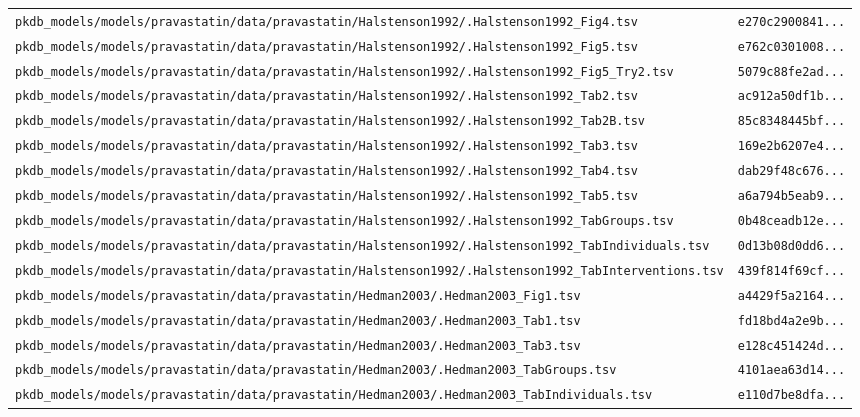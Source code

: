 \documentclass{article}
\begin{document}
\begin{longtable}{ll}
\texttt{pkdb\_models/models/pravastatin/data/pravastatin/Halstenson1992/.Halstenson1992\_Fig4.tsv} & \texttt{e270c2900841...} \\
\texttt{pkdb\_models/models/pravastatin/data/pravastatin/Halstenson1992/.Halstenson1992\_Fig5.tsv} & \texttt{e762c0301008...} \\
\texttt{pkdb\_models/models/pravastatin/data/pravastatin/Halstenson1992/.Halstenson1992\_Fig5\_Try2.tsv} & \texttt{5079c88fe2ad...} \\
\texttt{pkdb\_models/models/pravastatin/data/pravastatin/Halstenson1992/.Halstenson1992\_Tab2.tsv} & \texttt{ac912a50df1b...} \\
\texttt{pkdb\_models/models/pravastatin/data/pravastatin/Halstenson1992/.Halstenson1992\_Tab2B.tsv} & \texttt{85c8348445bf...} \\
\texttt{pkdb\_models/models/pravastatin/data/pravastatin/Halstenson1992/.Halstenson1992\_Tab3.tsv} & \texttt{169e2b6207e4...} \\
\texttt{pkdb\_models/models/pravastatin/data/pravastatin/Halstenson1992/.Halstenson1992\_Tab4.tsv} & \texttt{dab29f48c676...} \\
\texttt{pkdb\_models/models/pravastatin/data/pravastatin/Halstenson1992/.Halstenson1992\_Tab5.tsv} & \texttt{a6a794b5eab9...} \\
\texttt{pkdb\_models/models/pravastatin/data/pravastatin/Halstenson1992/.Halstenson1992\_TabGroups.tsv} & \texttt{0b48ceadb12e...} \\
\texttt{pkdb\_models/models/pravastatin/data/pravastatin/Halstenson1992/.Halstenson1992\_TabIndividuals.tsv} & \texttt{0d13b08d0dd6...} \\
\texttt{pkdb\_models/models/pravastatin/data/pravastatin/Halstenson1992/.Halstenson1992\_TabInterventions.tsv} & \texttt{439f814f69cf...} \\
\texttt{pkdb\_models/models/pravastatin/data/pravastatin/Hedman2003/.Hedman2003\_Fig1.tsv} & \texttt{a4429f5a2164...} \\
\texttt{pkdb\_models/models/pravastatin/data/pravastatin/Hedman2003/.Hedman2003\_Tab1.tsv} & \texttt{fd18bd4a2e9b...} \\
\texttt{pkdb\_models/models/pravastatin/data/pravastatin/Hedman2003/.Hedman2003\_Tab3.tsv} & \texttt{e128c451424d...} \\
\texttt{pkdb\_models/models/pravastatin/data/pravastatin/Hedman2003/.Hedman2003\_TabGroups.tsv} & \texttt{4101aea63d14...} \\
\texttt{pkdb\_models/models/pravastatin/data/pravastatin/Hedman2003/.Hedman2003\_TabIndividuals.tsv} & \texttt{e110d7be8dfa...} \\

\end{longtable}
\end{document}
